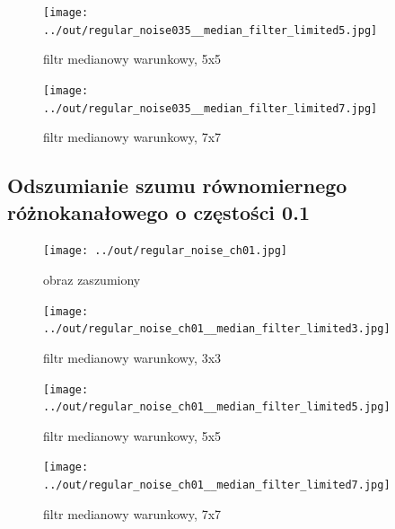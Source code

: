 \documentclass[a4paper,12pt]{article}
\begin{document}
\begin{figure}[h!]
\begin{minipage}[t]{7.5cm}
\begin{center}
\texttt{[image: ../out/regular\_noise035\_\_median\_filter\_limited5.jpg]}
\caption{filtr medianowy warunkowy, 5x5}
\end{center}
\end{minipage}
\hfill
\begin{minipage}[t]{7.5cm}
\begin{center}
\texttt{[image: ../out/regular\_noise035\_\_median\_filter\_limited7.jpg]}
\caption{filtr medianowy warunkowy, 7x7}
\end{center}
\end{minipage}
\end{figure}


\newpage
\subsection{Odszumianie szumu równomiernego różnokanałowego o częstości 0.1}
\begin{figure}[h!]
\begin{minipage}[t]{7.5cm}
\begin{center}
\texttt{[image: ../out/regular\_noise\_ch01.jpg]}
\caption{obraz zaszumiony}
\end{center}
\end{minipage}
\hfill
\begin{minipage}[t]{7.5cm}
\begin{center}
\texttt{[image: ../out/regular\_noise\_ch01\_\_median\_filter\_limited3.jpg]}
\caption{filtr medianowy warunkowy, 3x3}
\end{center}
\end{minipage}
\end{figure}

\begin{figure}[h!]
\begin{minipage}[t]{7.5cm}
\begin{center}
\texttt{[image: ../out/regular\_noise\_ch01\_\_median\_filter\_limited5.jpg]}
\caption{filtr medianowy warunkowy, 5x5}
\end{center}
\end{minipage}
\hfill
\begin{minipage}[t]{7.5cm}
\begin{center}
\texttt{[image: ../out/regular\_noise\_ch01\_\_median\_filter\_limited7.jpg]}
\caption{filtr medianowy warunkowy, 7x7}
\end{center}
\end{minipage}
\end{figure}
\end{document}
